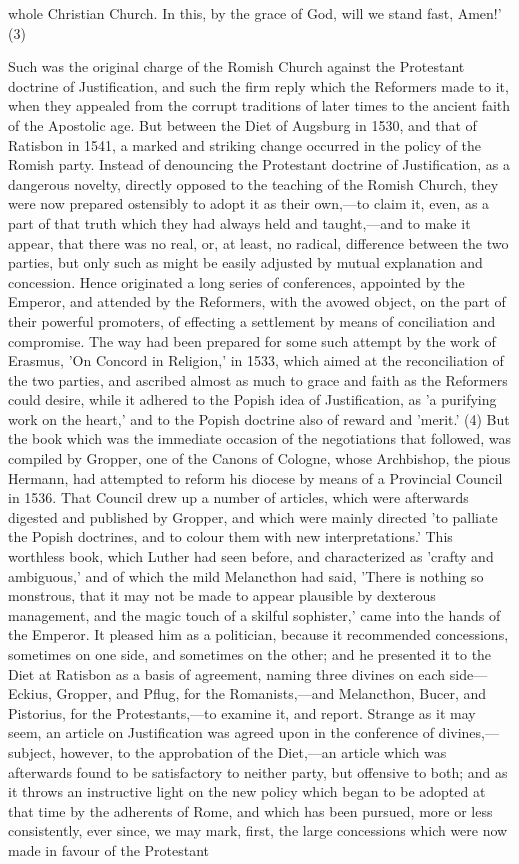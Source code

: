 \documentclass[
]{book}
\begin{document}
whole Christian Church. In this, by the grace of God, will we stand fast, Amen!' (3)

Such was the original charge of the Romish Church against the Protestant doctrine of Justification, and such the firm reply which the Reformers made to it, when they appealed from the corrupt traditions of later times to the ancient faith of the Apostolic age. But between the Diet of Augsburg in 1530, and that of Ratisbon in 1541, a marked and striking change occurred in the policy of the Romish party. Instead of denouncing the Protestant doctrine of Justification, as a dangerous novelty, directly opposed to the teaching of the Romish Church, they were now prepared ostensibly to adopt it as their own,---to claim it, even, as a part of that truth which they had always held and taught,---and to make it appear, that there was no real, or, at least, no radical, difference between the two parties, but only such as might be easily adjusted by mutual explanation and concession. Hence originated a long series of conferences, appointed by the Emperor, and attended by the Reformers, with the avowed object, on the part of their powerful promoters, of effecting a settlement by means of conciliation and compromise. The way had been prepared for some such attempt by the work of Erasmus, 'On Concord in Religion,' in 1533, which aimed at the reconciliation of the two parties, and ascribed almost as much to grace and faith as the Reformers could desire, while it adhered to the Popish idea of Justification, as 'a purifying work on the heart,' and to the Popish doctrine also of reward and 'merit.' (4) But the book which was the immediate occasion of the negotiations that followed, was compiled by Gropper, one of the Canons of Cologne, whose Archbishop, the pious Hermann, had attempted to reform his diocese by means of a Provincial Council in 1536. That Council drew up a number of articles, which were afterwards digested and published by Gropper, and which were mainly directed 'to palliate the Popish doctrines, and to colour them with new interpretations.' This worthless book, which Luther had seen before, and characterized as 'crafty and ambiguous,' and of which the mild Melancthon had said, 'There is nothing so monstrous, that it may not be made to appear plausible by dexterous management, and the magic touch of a skilful sophister,' came into the hands of the Emperor. It pleased him as a politician, because it recommended concessions, sometimes on one side, and sometimes on the other; and he presented it to the Diet at Ratisbon as a basis of agreement, naming three divines on each side---Eckius, Gropper, and Pflug, for the Romanists,---and Melancthon, Bucer, and Pistorius, for the Protestants,---to examine it, and report. Strange as it may seem, an article on Justification was agreed upon in the conference of divines,---subject, however, to the approbation of the Diet,---an article which was afterwards found to be satisfactory to neither party, but offensive to both; and as it throws an instructive light on the new policy which began to be adopted at that time by the adherents of Rome, and which has been pursued, more or less consistently, ever since, we may mark, first, the large concessions which were now made in favour of the Protestant 
\end{document}

